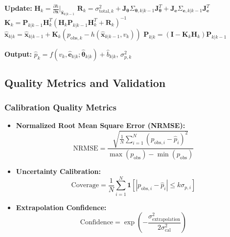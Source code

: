 \documentclass[11pt]{article}
\begin{document}
\begin{algorithm}
\begin{algorithmic}[1]
    \State \textbf{Update:}
    \State $\mathbf{H}_k = \frac{\partial h}{\partial \mathbf{x}}|_{\hat{\mathbf{x}}_{k|k-1}}$
    \State $\mathbf{R}_k = \sigma_{\text{total},k}^2 + \mathbf{J}_{\bm{\theta}} \Sigma_{\bm{\theta},k|k-1} \mathbf{J}_{\bm{\theta}}^T + \mathbf{J}_{\mathbf{e}} \Sigma_{\mathbf{e},k|k-1} \mathbf{J}_{\mathbf{e}}^T$
    \State $\mathbf{K}_k = \mathbf{P}_{k|k-1} \mathbf{H}_k^T (\mathbf{H}_k \mathbf{P}_{k|k-1} \mathbf{H}_k^T + \mathbf{R}_k)^{-1}$
    \State $\hat{\mathbf{x}}_{k|k} = \hat{\mathbf{x}}_{k|k-1} + \mathbf{K}_k (p_{\text{obs},k} - h(\hat{\mathbf{x}}_{k|k-1}, v_k))$
    \State $\mathbf{P}_{k|k} = (\mathbf{I} - \mathbf{K}_k \mathbf{H}_k) \mathbf{P}_{k|k-1}$
    
    \State \textbf{Output:} $\hat{p}_k = f(v_k, \hat{\mathbf{e}}_{k|k}; \hat{\bm{\theta}}_{k|k}) + \hat{b}_{k|k}$, $\sigma_{p,k}^2$
\EndFor
\end{algorithmic}
\end{algorithm}

\subsection{Quality Metrics and Validation}

\subsubsection{Calibration Quality Metrics}
\begin{itemize}
\item \textbf{Normalized Root Mean Square Error (NRMSE):}
\begin{equation}
\text{NRMSE} = \frac{\sqrt{\frac{1}{N}\sum_{i=1}^N (p_{\text{obs},i} - \hat{p}_i)^2}}{\max(p_{\text{obs}}) - \min(p_{\text{obs}})}
\end{equation}

\item \textbf{Uncertainty Calibration:}
\begin{equation}
\text{Coverage} = \frac{1}{N}\sum_{i=1}^N \mathbf{1}[|p_{\text{obs},i} - \hat{p}_i| \leq k\sigma_{p,i}]
\end{equation}

\item \textbf{Extrapolation Confidence:}
\begin{equation}
\text{Confidence} = \exp\left(-\frac{\sigma_{\text{extrapolation}}^2}{2\sigma_{\text{cal}}^2}\right)
\end{equation}
\end{itemize}
\end{document}

